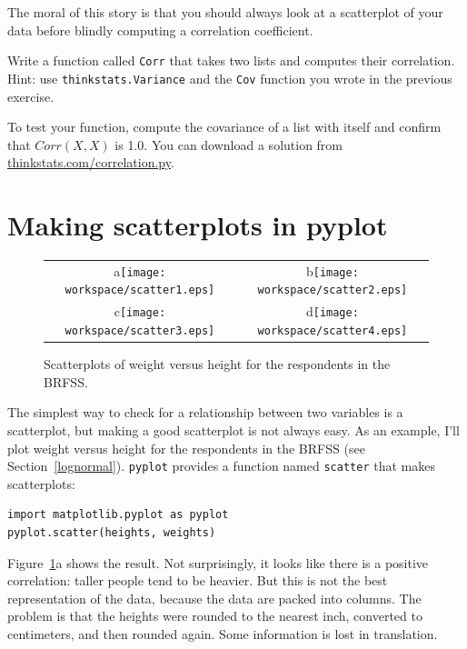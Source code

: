 \documentclass[12pt]{book}
\begin{document}
The moral of this story is that you should always look at a scatterplot of
your data before blindly computing a correlation coefficient.

\begin{ex}

Write a function called {\tt Corr} that takes two lists and
computes their correlation.  Hint: use {\tt thinkstats.Variance} and
the {\tt Cov} function you wrote in the previous exercise.

To test your function, compute the covariance of a list with itself
and confirm that $Corr(X, X)$ is 1.0.  You can download a solution
from \url{thinkstats.com/correlation.py}.

\end{ex}


\section{Making scatterplots in pyplot}

\begin{figure}
\centering
\begin{tabular}{cc}
a\texttt{[image: workspace/scatter1.eps]} &
b\texttt{[image: workspace/scatter2.eps]} \\
c\texttt{[image: workspace/scatter3.eps]} &
d\texttt{[image: workspace/scatter4.eps]} \\ 
\end{tabular}
\caption{Scatterplots of weight versus height for the respondents
in the BRFSS.}
\label{scatterplots}
\end{figure}


The simplest way to check for a relationship between two variables
is a scatterplot, but making a good scatterplot is not always easy.
As an example, I'll plot weight versus height for the respondents
in the BRFSS (see Section~\ref{lognormal}).  {\tt pyplot} provides
a function named {\tt scatter} that makes scatterplots:

\begin{verbatim}
import matplotlib.pyplot as pyplot
pyplot.scatter(heights, weights)
\end{verbatim}

Figure~\ref{scatterplots}a shows the result.  Not surprisingly, it
looks like there is a positive correlation: taller people tend to be
heavier.  But this is not the best representation of the data, because
the data are packed into columns.  The problem is that the heights
were rounded to the nearest inch, converted to centimeters, and
then rounded again.  Some information is lost in translation.
\end{document}
